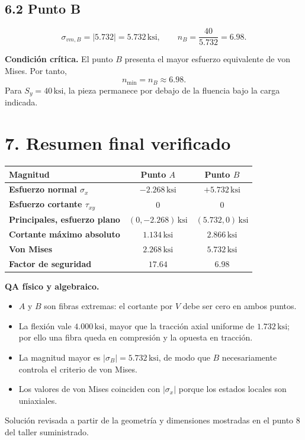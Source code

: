 \documentclass[11pt]{article}
\newcommand{\ksi}{\,\mathrm{ksi}}
\begin{document}
\subsection*{6.2 Punto B}
\[
\sigma_{vm,B}=|5.732|=\boxed{5.732\ksi},
\qquad
n_B=\frac{40}{5.732}=\boxed{6.98}.
\]

\begin{resultbox}
\textbf{Condici\'on cr\'itica.} El punto $B$ presenta el mayor esfuerzo equivalente de von Mises. Por tanto,
\[
\boxed{n_{\min}=n_B\approx6.98}.
\]
Para $S_y=40\ksi$, la pieza permanece por debajo de la fluencia bajo la carga indicada.
\end{resultbox}

\section*{7. Resumen final verificado}

\begin{center}
\renewcommand{\arraystretch}{1.35}
\begin{tabular}{>{\bfseries}lcc}
\toprule
Magnitud & Punto $A$ & Punto $B$\\
\midrule
Esfuerzo normal $\sigma_x$ & $-2.268\ksi$ & $+5.732\ksi$\\
Esfuerzo cortante $\tau_{xy}$ & $0$ & $0$\\
Principales, esfuerzo plano & $(0,-2.268)\ksi$ & $(5.732,0)\ksi$\\
Cortante m\'aximo absoluto & $1.134\ksi$ & $2.866\ksi$\\
Von Mises & $2.268\ksi$ & $5.732\ksi$\\
Factor de seguridad & $17.64$ & $6.98$\\
\bottomrule
\end{tabular}
\end{center}

\begin{checkbox}
\textbf{QA f\'isico y algebraico.}
\begin{itemize}
\item $A$ y $B$ son fibras extremas: el cortante por $V$ debe ser cero en ambos puntos.
\item La flexi\'on vale $4.000\ksi$, mayor que la tracci\'on axial uniforme de $1.732\ksi$; por ello una fibra queda en compresi\'on y la opuesta en tracci\'on.
\item La magnitud mayor es $|\sigma_B|=5.732\ksi$, de modo que $B$ necesariamente controla el criterio de von Mises.
\item Los valores de von Mises coinciden con $|\sigma_x|$ porque los estados locales son uniaxiales.
\end{itemize}
\end{checkbox}

\vfill
\begin{center}
\small Soluci\'on revisada a partir de la geometr\'ia y dimensiones mostradas en el punto 8 del taller suministrado.
\end{center}
\end{document}
